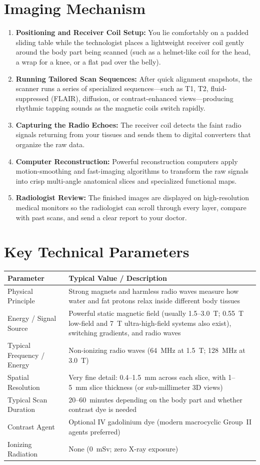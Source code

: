 \section{Imaging Mechanism}
\begin{enumerate}
\item \textbf{Positioning and Receiver Coil Setup:} You lie comfortably on a padded sliding table while the technologist places a lightweight receiver coil gently around the body part being scanned (such as a helmet-like coil for the head, a wrap for a knee, or a flat pad over the belly).
\item \textbf{Running Tailored Scan Sequences:} After quick alignment snapshots, the scanner runs a series of specialized sequences---such as T1, T2, fluid-suppressed (FLAIR), diffusion, or contrast-enhanced views---producing rhythmic tapping sounds as the magnetic coils switch rapidly.
\item \textbf{Capturing the Radio Echoes:} The receiver coil detects the faint radio signals returning from your tissues and sends them to digital converters that organize the raw data.
\item \textbf{Computer Reconstruction:} Powerful reconstruction computers apply motion-smoothing and fast-imaging algorithms to transform the raw signals into crisp multi-angle anatomical slices and specialized functional maps.
\item \textbf{Radiologist Review:} The finished images are displayed on high-resolution medical monitors so the radiologist can scroll through every layer, compare with past scans, and send a clear report to your doctor.
\end{enumerate}

\section{Key Technical Parameters}
\noindent
\begin{tabularx}{\textwidth}{@{}l X@{}}
\toprule
\textbf{Parameter} & \textbf{Typical Value / Description} \\
\midrule
Physical Principle & Strong magnets and harmless radio waves measure how water and fat protons relax inside different body tissues \\
Energy / Signal Source & Powerful static magnetic field (usually 1.5--3.0~T; 0.55~T low-field and 7~T ultra-high-field systems also exist), switching gradients, and radio waves \\
Typical Frequency / Energy & Non-ionizing radio waves (64~MHz at 1.5~T; 128~MHz at 3.0~T) \\
Spatial Resolution & Very fine detail: 0.4--1.5~mm across each slice, with 1--5~mm slice thickness (or sub-millimeter 3D views) \\
Typical Scan Duration & 20--60~minutes depending on the body part and whether contrast dye is needed \\
Contrast Agent & Optional IV gadolinium dye (modern macrocyclic Group~II agents preferred) \\
Ionizing Radiation & None (0~mSv; zero X-ray exposure) \\
\bottomrule
\end{tabularx}

